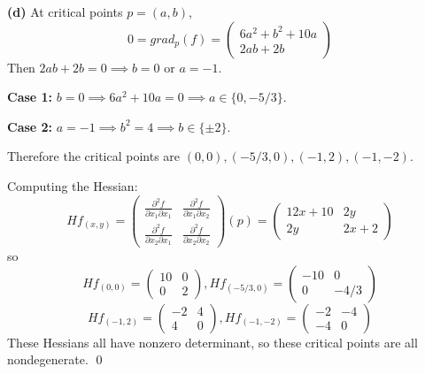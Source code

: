 \documentclass[a4paper, 12pt]{article}
\begin{document}
\begin{solution}
    \textbf{(d)} At critical points $p = (a, b)$, \[
        0 = grad_p(f) = \begin{pmatrix}
            6a^2 + b^2 + 10a \\
            2ab + 2b
        \end{pmatrix}
    \]
    Then $2ab + 2b = 0\implies b = 0$ or $a = -1$.

    \textbf{Case 1: } $b = 0 \implies 6a^2 + 10a = 0 \implies a \in \{0, -5/3\}$.

    \textbf{Case 2: } $a = -1 \implies b^2 = 4 \implies b \in \{\pm 2\}$.

    Therefore the critical points are $(0, 0), (-5/3, 0), (-1, 2), (-1, -2)$.

    Computing the Hessian: \[
        Hf_{(x, y)} = \begin{pmatrix}
            \frac{\partial ^2 f}{\partial x_1 \partial x_1} & \frac{\partial ^2 f}{\partial x_1 \partial x_2} \\
            \frac{\partial^2  f}{\partial x_2 \partial x_1} & \frac{\partial^2  f}{\partial x_2 \partial x_2}
        \end{pmatrix}(p) = \begin{pmatrix}
            12x + 10 & 2y   \\
            2y       & 2x+2
        \end{pmatrix}
    \]
    so
    \[
        Hf_{(0, 0)} = \begin{pmatrix}
            10 & 0 \\
            0  & 2
        \end{pmatrix}, Hf_{(-5/3, 0)} = \begin{pmatrix}
            - 10 & 0 \\
            0 & -4/3
        \end{pmatrix}
    \]
    \[
        Hf_{(-1, 2)} = \begin{pmatrix}
            -2 & 4 \\
            4  & 0
        \end{pmatrix}, Hf_{(-1, -2)} = \begin{pmatrix}
            -2 & -4 \\
            -4 & 0
        \end{pmatrix}
    \]
    These Hessians all have nonzero determinant, so these critical points are all nondegenerate. \qed


\end{solution}
\end{document}
